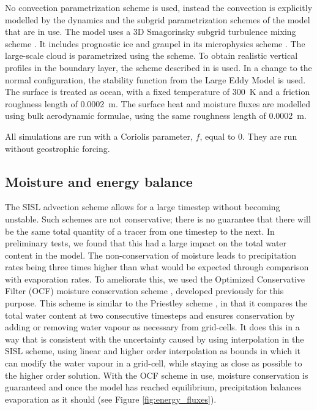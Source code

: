 \documentclass[11pt,a4paper]{article}
\begin{document}
No convection parametrization scheme is used, instead the convection is explicitly modelled by the dynamics and the subgrid parametrization schemes of the model that are in use. The model uses a 3D Smagorinsky subgrid turbulence mixing scheme \parencite{todocite}. It includes prognostic ice and graupel in its microphysics scheme \parencite{todocite}. The large-scale cloud is parametrized using the \cite{smith1990scheme} scheme. To obtain realistic vertical profiles in the boundary layer, the scheme described in \cite{lock2000new} is used. In a change to the normal configuration, the stability function from the Large Eddy Model \parencite{petch2001sensitivity} is used. The surface is treated as ocean, with a fixed temperature of \SI{300}{K} and a friction roughness length of \SI{0.0002}{m}. The surface heat and moisture fluxes are modelled using bulk aerodynamic formulae, using the same roughness length of \SI{0.0002}{m}.

All simulations are run with a Coriolis parameter, $f$, equal to 0. They are run without geostrophic forcing.

\subsection{Moisture and energy balance}

The SISL advection scheme allows for a large timestep without becoming unstable. Such schemes are not conservative; there is no guarantee that there will be the same total quantity of a tracer from one timestep to the next. In preliminary tests, we found that this had a large impact on the total water content in the model. The non-conservation of moisture leads to precipitation rates being three times higher than what would be expected through comparison with evaporation rates. To ameliorate this, we used the Optimized Conservative Filter (OCF) moisture conservation scheme \parencite{zerroukat2015monotonic}, developed previously for this purpose. This scheme is similar to the Priestley scheme \parencite{priestley1993quasi}, in that it compares the total water content at two consecutive timesteps and ensures conservation by adding or removing water vapour as necessary from grid-cells. It does this in a way that is consistent with the uncertainty caused by using interpolation in the SISL scheme, using linear and higher order interpolation as bounds in which it can modify the water vapour in a grid-cell, while staying as close as possible to the higher order solution. With the OCF scheme in use, moisture conservation is guaranteed and once the model has reached equilibrium, precipitation balances evaporation as it should (see Figure \ref{fig:energy_fluxes}).
\end{document}
